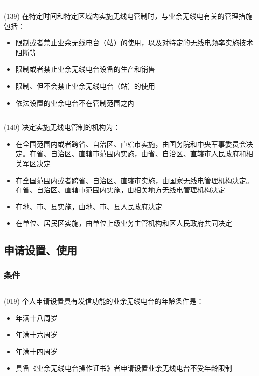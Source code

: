 \documentclass[twocolumn,hyperref,UTF8]{ctexart}  %
\begin{document}
\noindent\rule{0.5\textwidth}{1pt}
\heiti (139) 在特定时间和特定区域内实施无线电管制时，与业余无线电有关的管理措施包括： \songti {\color{gray} [LK0107] }
\begin{itemize}
	\item  限制或者禁止业余无线电台（站）的使用，以及对特定的无线电频率实施技术阻断等
	\item  限制或者禁止业余无线电台设备的生产和销售
	\item  限制、但不会禁止业余无线电台（站）的使用
	\item  依法设置的业余电台不在管制范围之内
\end{itemize}


\noindent\rule{0.5\textwidth}{1pt}
\heiti (140) 决定实施无线电管制的机构为： \songti {\color{gray} [LK0108] }
\begin{itemize}
	\item  在全国范围内或者跨省、自治区、直辖市实施，由国务院和中央军事委员会决定。在省、自治区、直辖市范围内实施，由省、自治区、直辖市人民政府和相关军区决定
	\item  在全国范围内或者跨省、自治区、直辖市实施，由国家无线电管理机构决定。在省、自治区、直辖市范围内实施，由相关地方无线电管理机构决定
	\item  在地、市、县实施，由地、市、县人民政府决定
	\item  在单位、居民区实施，由单位上级业务主管机构和区人民政府共同决定
\end{itemize}



\clearpage
\subsection{申请设置、使用}

\subsubsection{条件}

\noindent\rule{0.5\textwidth}{1pt}
\heiti (019) {\color{cyan}个人申请设置}具有发信功能的业余无线电台的年龄条件是： \songti {\color{gray} [LK0026] }
\begin{itemize}
	\item  年满十八周岁
	\item  年满十六周岁
	\item  年满十四周岁
	\item  具备《业余无线电台操作证书》者申请设置业余无线电台不受年龄限制
\end{itemize}
\end{document}
